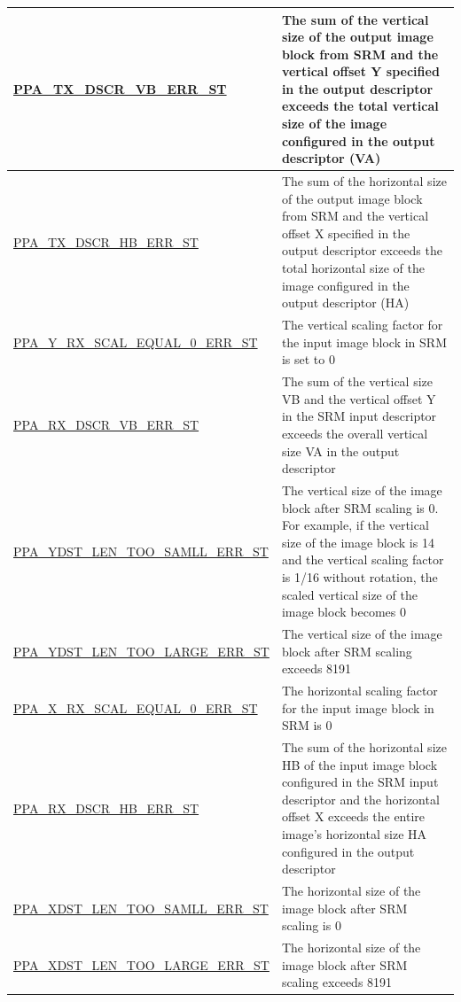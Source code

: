 \documentclass[main\_\_EN.tex]{subfiles}
\begin{document}
\begin{longtable}[c]{ |p{6cm}|p{10cm}| }
        \hyperref[fielddesc:PPATXDSCRVBERRST]{PPA\_TX\_DSCR\_VB\_ERR\_ST} & The sum of the vertical size of the output image block from SRM and the vertical offset Y specified in the output descriptor exceeds the total vertical size of the image configured in the output descriptor (VA) \\\hline
        \hyperref[fielddesc:PPATXDSCRHBERRST]{PPA\_TX\_DSCR\_HB\_ERR\_ST} & The sum of the horizontal size of the output image block from SRM and the vertical offset X specified in the output descriptor exceeds the total horizontal size of the image configured in the output descriptor (HA) \\\hline
        \hyperref[fielddesc:PPAYRXSCALEQUAL0ERRST]{PPA\_Y\_RX\_SCAL\_EQUAL\_0\_ERR\_ST} & The vertical scaling factor for the input image block in SRM is set to 0 \\\hline
        \hyperref[fielddesc:PPARXDSCRVBERRST]{PPA\_RX\_DSCR\_VB\_ERR\_ST} & The sum of the vertical size VB and the vertical offset Y in the SRM input descriptor exceeds the overall vertical size VA in the output descriptor \\\hline
        \hyperref[fielddesc:PPAYDSTLENTOOSAMLLERRST]{PPA\_YDST\_LEN\_TOO\_SAMLL\_ERR\_ST} & The vertical size of the image block after SRM scaling is 0. For example, if the vertical size of the image block is 14 and the vertical scaling factor is 1/16 without rotation, the scaled vertical size of the image block becomes 0 \\\hline
        \hyperref[fielddesc:PPAYDSTLENTOOLARGEERRST]{PPA\_YDST\_LEN\_TOO\_LARGE\_ERR\_ST} & The vertical size of the image block after SRM scaling exceeds 8191 \\\hline
        \hyperref[fielddesc:PPAXRXSCALEQUAL0ERRST]{PPA\_X\_RX\_SCAL\_EQUAL\_0\_ERR\_ST} & The horizontal scaling factor for the input image block in SRM is 0 \\\hline
        \hyperref[fielddesc:PPARXDSCRHBERRST]{PPA\_RX\_DSCR\_HB\_ERR\_ST} & The sum of the horizontal size HB of the input image block configured in the SRM input descriptor and the horizontal offset X exceeds the entire image's horizontal size HA configured in the output descriptor \\\hline
        \hyperref[fielddesc:PPAXDSTLENTOOSAMLLERRST]{PPA\_XDST\_LEN\_TOO\_SAMLL\_ERR\_ST} & The horizontal size of the image block after SRM scaling is 0 \\\hline
        \hyperref[fielddesc:PPAXDSTLENTOOLARGEERRST]{PPA\_XDST\_LEN\_TOO\_LARGE\_ERR\_ST} & The horizontal size of the image block after SRM scaling exceeds 8191 \\\hline

\end{longtable}
\end{document}
